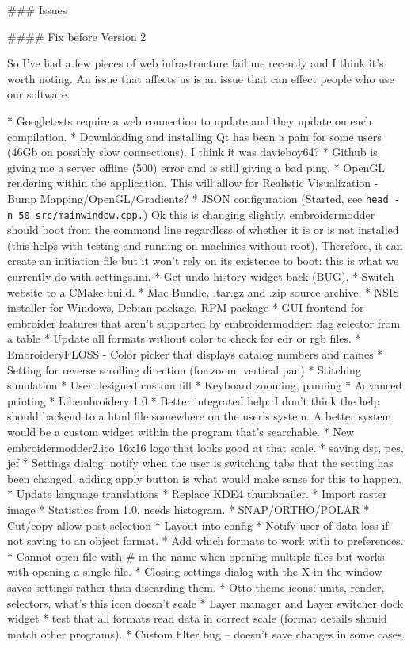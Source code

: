 ### Issues

#### Fix before Version 2

So I've had a few pieces of web infrastructure fail me recently and I
think it's worth noting. An issue that affects us is an issue that can
effect people who use our software.

* Googletests require a web connection to update and they update on each compilation.
* Downloading and installing Qt has been a pain for some users (46Gb on possibly slow connections). I think it was davieboy64?
* Github is giving me a server offline (500) error and is still giving a bad ping.
* OpenGL rendering within the application. This will allow for Realistic Visualization - Bump Mapping/OpenGL/Gradients?
* JSON configuration (Started, see \texttt{head\ -n\ 50\ src/mainwindow.cpp.}) Ok this is changing slightly. embroidermodder should boot from the command line regardless of whether it is or is not installed (this helps with testing and running on machines without root). Therefore, it can create an initiation file but it won't rely on its existence to boot: this is what we currently do with settings.ini.
* Get undo history widget back (BUG).
* Switch website to a CMake build.
* Mac Bundle, .tar.gz and .zip source archive.
* NSIS installer for Windows, Debian package, RPM package
* GUI frontend for embroider features that aren't supported by  embroidermodder: flag selector from a table
* Update all formats without color to check for edr or rgb files.
* EmbroideryFLOSS - Color picker that displays catalog numbers and names
* Setting for reverse scrolling direction (for zoom, vertical pan)
* Stitching simulation
* User designed custom fill
* Keyboard zooming, panning
* Advanced printing
* Libembroidery 1.0
* Better integrated help: I don't think the help should backend to a html file somewhere on the user's system. A better system would be a custom widget within the program that's searchable.
* New embroidermodder2.ico 16x16 logo that looks good at that scale.
* saving dst, pes, jef
* Settings dialog: notify when the user is switching tabs that the setting has been changed, adding apply button is what would make sense for this to happen.
* Update language translations
* Replace KDE4 thumbnailer.
* Import raster image
* Statistics from 1.0, needs histogram.
* SNAP/ORTHO/POLAR
* Cut/copy allow post-selection
* Layout into config
* Notify user of data loss if not saving to an object format.
* Add which formats to work with to preferences.
* Cannot open file with \# in the name when opening multiple files but  works with opening a single file.
* Closing settings dialog with the X in the window saves settings rather than discarding them.
* Otto theme icons: units, render, selectors, what's this icon doesn't scale
* Layer manager and Layer switcher dock widget
*  test that all formats read data in correct scale (format details should match other programs).
* Custom filter bug -- doesn't save changes in some cases.

